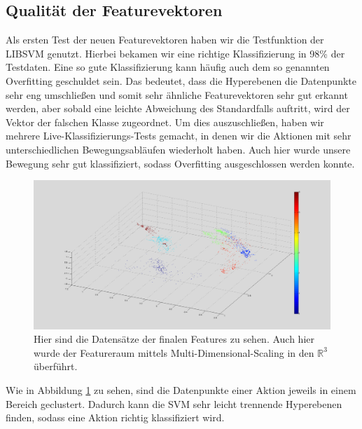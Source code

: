 \subsection{Qualität der Featurevektoren}
\label{subsec:qualitaet-der-feature-vektoren}
Als ersten Test der neuen Featurevektoren haben wir die Testfunktion der LIBSVM genutzt. Hierbei bekamen wir eine richtige Klassifizierung in 98\% der Testdaten. Eine so gute Klassifizierung kann häufig auch dem so genannten \glqq{}Overfitting\grqq{} geschuldet sein. Das bedeutet, dass die Hyperebenen die Datenpunkte sehr eng umschließen und somit sehr ähnliche Featurevektoren sehr gut erkannt werden, aber sobald eine leichte Abweichung des Standardfalls auftritt, wird der Vektor der falschen Klasse zugeordnet. Um dies auszuschließen, haben wir mehrere Live-Klassifizierungs-Tests gemacht, in denen wir die Aktionen mit sehr unterschiedlichen Bewegungsabläufen wiederholt haben. Auch hier wurde unsere Bewegung sehr gut klassifiziert, sodass Overfitting ausgeschlossen werden konnte.
\begin{figure}[hbtp]
\includegraphics[width=1.0\linewidth]{NewFeatures.png}
\caption{Hier sind die Datensätze der finalen Features zu sehen. Auch hier wurde der Featureraum mittels Multi-Dimensional-Scaling in den $\mathbb{R}^3$ überführt.}
\label{fig:New-Features}
\end{figure}
Wie in Abbildung \ref{fig:New-Features} zu sehen, sind die Datenpunkte einer Aktion jeweils in einem Bereich geclustert. Dadurch kann die SVM sehr leicht trennende Hyperebenen finden, sodass eine Aktion richtig klassifiziert wird.

